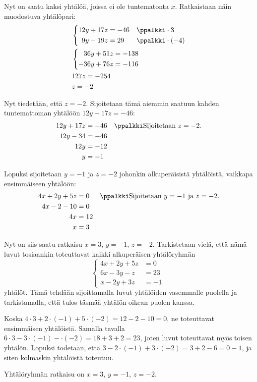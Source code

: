 \begin{esimerkki}
\begin{esimratk}
Nyt on saatu kaksi yhtälöä, joissa ei ole tuntematonta $x$. Ratkaistaan näin muodostuva yhtälöpari:
\begin{align*}
&\left\{
\begin{aligned}
12y+17z&=-46 && \ppalkki \cdot 3 \\
9y-19z&=29 && \ppalkki \cdot (-4) \\
\end{aligned}
\right. \\
&\left\{
\begin{aligned}
36y+51z&=-138  \\
-36y+76z&=-116  \\
\end{aligned}
\right. \\
&127z=-254 \\
&z=-2 \\
\end{align*}

Nyt tiedetään, että $z=-2$. Sijoitetaan tämä aiemmin saatuun kahden tuntemattoman yhtälöön $12y+17z=-46$:
\begin{align*}
12y+17z&=-46 && \ppalkki \text{Sijoitetaan $z=-2$.} \\
12y-34&=-46 && \\
12y&=-12 && \\
y&=-1 && \\
\end{align*}

Lopuksi sijoitetaan $y=-1$ ja $z=-2$ johonkin alkuperäisistä yhtälöistä, vaikkapa ensimmäiseen yhtälöön:
\begin{align*}
4x+2y+5z&=0 && \ppalkki \text{Sijoitetaan $y=-1$ ja $z=-2$.} \\
4x-2-10&=0 && \\
4x&=12 && \\
x&=3 && \\
\end{align*}

Nyt on siis saatu ratkaisu $x=3$, $y=-1$, $z=-2$. Tarkistetaan vielä, että nämä luvut tosiaankin toteuttavat kaikki alkuperäisen yhtälöryhmän
\[
\left\{
\begin{aligned}
4x+2y+5z&=0 \\
6x-3y-z&= 23 \\
x-2y+3z&= -1.
\end{aligned}
\right.
\]
yhtälöt. Tämä tehdään sijoittamalla luvut yhtälöiden vasemmalle puolella ja tarkistamalla, että tulos täsmää yhtälön oikean puolen kanssa.

Koska $4 \cdot 3+2\cdot(-1)+5\cdot(-2)=12-2-10=0$, ne toteuttavat ensimmäisen yhtälöistä. Samalla tavalla $6 \cdot 3-3\cdot(-1)-\cdot(-2)=18+3+2=23$, joten luvut toteuttavat myös toisen yhtälön. Lopuksi todetaan, että $3-2\cdot(-1)+3\cdot(-2)=3+2-6=0-1$, ja siten kolmaskin yhtälöistä toteutuu.

\end{esimratk}
\begin{esimvast}
Yhtälöryhmän ratkaisu on $x=3$, $y=-1$, $z=-2$.
\end{esimvast}
\end{esimerkki}

